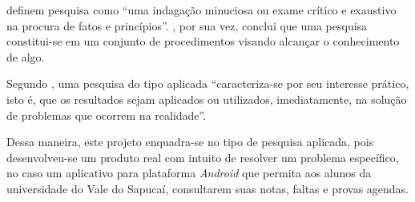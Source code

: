 	
	\par {} definem pesquisa como “uma indagação minuciosa
ou exame crítico e exaustivo na procura de fatos e princípios”.
, por sua vez, conclui que uma pesquisa constitui-se
em um conjunto de procedimentos visando alcançar o conhecimento de algo.

	\par Segundo , uma pesquisa do tipo aplicada
“caracteriza-se por seu interesse prático, isto é, que os resultados sejam
aplicados ou utilizados, imediatamente, na solução de problemas que ocorrem na
realidade”.

	\par Dessa maneira, este projeto enquadra-se no tipo de pesquisa aplicada,
pois desenvolveu-se um produto real com intuito de resolver um problema específico,
no caso um aplicativo para plataforma \textit{Android} que permita aos alunos da universidade
do Vale do Sapucaí, consultarem suas notas, faltas e provas agendas.